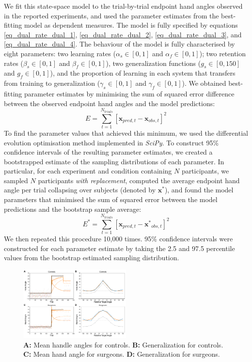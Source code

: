 \documentclass[jou, apacite, 11pt, longtable, floatsintext, notab]{apa6}
\begin{document}
We fit this state-space model to the trial-by-trial endpoint
hand angles observed in the reported experiments, and used
the parameter estimates from the best-fitting model as
dependent measures. The model is fully specified by
equations \ref{eq_dual_rate_dual_1},
\ref{eq_dual_rate_dual_2}, \ref{eq_dual_rate_dual_3}, and
\ref{eq_dual_rate_dual_4}. The behaviour of the model is
fully characterised by eight parameters: two learning rates
($\alpha_s \in [0, 1]$ and $\alpha_f \in [0,1]$); two
retention rates ($\beta_s \in [0,1]$ and $\beta_f \in
[0,1]$), two generalization functions ($g_s \in [0, 150]$
and $g_f \in [0, 1]$), and the proportion of learning in
each system that transfers from training to generalization
($\gamma_s \in [0,1]$ and $\gamma_f \in [0,1]$).
We obtained best-fitting parameter estimates by minimising
the sum of squared error difference between the observed
endpoint hand angles and the model predictions:
\begin{equation}
  E = \sum_{t=1}^{N_{trials}} \left[ \boldsymbol{x}_{pred, t} - \boldsymbol{x}_{obs, t} \right]^2
  \label{eq_sse}
\end{equation}
To find the parameter values that achieved this minimum, we
used the differential evolution optimisation method
implemented in \textit{SciPy}. To construct 95\% confidence
intervals of the resulting parameter estimates, we created a
bootstrapped estimate of the sampling distributions of each
parameter. In particular, for each experiment and condition
containing $N$ participants, we sampled $N$
participants \textit{with replacement}, computed the average
endpoint hand angle per trial collapsing over subjects
(denoted by $\boldsymbol{x^{*}}$), and found the model
parameters that minimised the sum of squared error between
the model predictions and the bootstrap sample average:
\begin{equation}
    E^* = \sum_{t=1}^{N_{trials}} \left[ \boldsymbol{x}_{pred, t} - \boldsymbol{x^*}_{obs, t} \right]^2
  \label{eq_sse}
\end{equation}
We then repeated this procedure 10,000 times. 95\%
confidence intervals were constructed for each parameter
estimate by taking the 2.5 and 97.5 percentile values from
the bootstrap estimated sampling distribution.

\begin{figure}[t]
  \centering
  \includegraphics[width=0.5\textwidth]{figures/fig_results.pdf}
  \caption{\scriptsize
   \textbf{A:} Mean handle angles for controls.
   \textbf{B:} Generalization for controls.
   \textbf{C:} Mean hand angle for surgeons.
   \textbf{D:} Generalization for surgeons.
  }
  \label{fig_results}
\end{figure}
\end{document}
